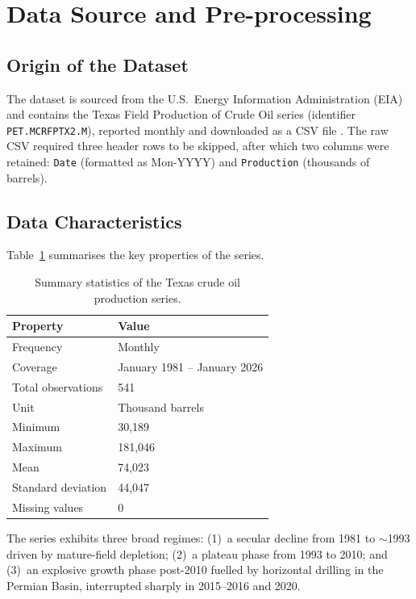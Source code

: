 \documentclass[12pt,a4paper]{article}
\begin{document}
\section{Data Source and Pre-processing}

\subsection{Origin of the Dataset}

The dataset is sourced from the U.S.\ Energy Information Administration (EIA) and contains the Texas Field Production of Crude Oil series (identifier \texttt{PET.MCRFPTX2.M}), reported monthly and downloaded as a CSV file \citep{eia2026}. The raw CSV required three header rows to be skipped, after which two columns were retained: \texttt{Date} (formatted as Mon-YYYY) and \texttt{Production} (thousands of barrels).

\subsection{Data Characteristics}

Table~\ref{tab:summary} summarises the key properties of the series.

\begin{table}[H]
\centering
\caption{Summary statistics of the Texas crude oil production series.}
\label{tab:summary}
\begin{tabular}{@{}ll@{}}
\toprule
\textbf{Property} & \textbf{Value} \\
\midrule
Frequency          & Monthly \\
Coverage           & January 1981 -- January 2026 \\
Total observations & 541 \\
Unit               & Thousand barrels \\
Minimum            & 30,189 \\
Maximum            & 181,046 \\
Mean               & 74,023 \\
Standard deviation & 44,047 \\
Missing values     & 0 \\
\bottomrule
\end{tabular}
\end{table}

The series exhibits three broad regimes: (1)~a secular decline from 1981 to $\sim$1993 driven by mature-field depletion; (2)~a plateau phase from 1993 to 2010; and (3)~an explosive growth phase post-2010 fuelled by horizontal drilling in the Permian Basin, interrupted sharply in 2015--2016 and 2020.
\end{document}
